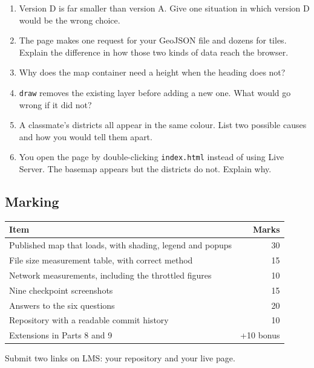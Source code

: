\documentclass{article}
\newcommand{\cd}[1]{\texttt{#1}}
\begin{document}
\begin{enumerate}
  \item Version D is far smaller than version A. Give one situation in
        which version D would be the wrong choice.
  \item The page makes one request for your GeoJSON file and dozens for
        tiles. Explain the difference in how those two kinds of data
        reach the browser.
  \item Why does the map container need a height when the heading does
        not?
  \item \cd{draw} removes the existing layer before adding a new one.
        What would go wrong if it did not?
  \item A classmate's districts all appear in the same colour. List two
        possible causes and how you would tell them apart.
  \item You open the page by double-clicking \cd{index.html} instead of
        using Live Server. The basemap appears but the districts do not.
        Explain why.
\end{enumerate}

\subsection{Marking}

\begin{tabularx}{\textwidth}{@{}X r@{}}
\toprule
\textbf{Item} & \textbf{Marks} \\
\midrule
Published map that loads, with shading, legend and popups & 30 \\
File size measurement table, with correct method          & 15 \\
Network measurements, including the throttled figures     & 10 \\
Nine checkpoint screenshots                               & 15 \\
Answers to the six questions                              & 20 \\
Repository with a readable commit history                 & 10 \\
\midrule
Extensions in Parts 8 and 9                               & +10 bonus \\
\bottomrule
\end{tabularx}

\vspace{1em}
Submit two links on LMS: your repository and your live page.

\end{document}
